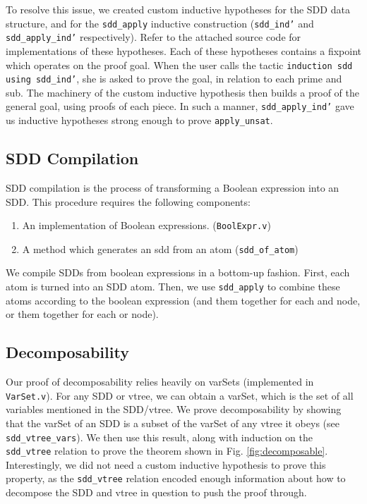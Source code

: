 \documentclass[twocolumn]{article}
\theoremstyle{definition}
\begin{document}
To resolve this issue, we created custom inductive hypotheses for the SDD data structure, and for the \texttt{sdd\_apply} inductive construction (\texttt{sdd\_ind'} and \texttt{sdd\_apply\_ind'} respectively). Refer to the attached source code for implementations of these hypotheses. Each of these hypotheses contains a fixpoint which operates on the proof goal. When the user calls the tactic \texttt{induction sdd using sdd\_ind'}, she is asked to prove the goal, in relation to each prime and sub. The machinery of the custom inductive hypothesis then builds a proof of the general goal, using proofs of each piece. In such a manner, \texttt{sdd\_apply\_ind'} gave us inductive hypotheses strong enough to prove \texttt{apply\_unsat}.

\subsection{SDD Compilation}
SDD compilation is the process of transforming a Boolean expression into an SDD.
This procedure requires the following components:
\begin{enumerate}
\item An implementation of Boolean expressions. (\texttt{BoolExpr.v})
\item A method which generates an sdd from an atom (\texttt{sdd\_of\_atom})
\end{enumerate}

We compile SDDs from boolean expressions in a bottom-up fashion. First, each atom is turned into an SDD atom. Then, we use \texttt{sdd\_apply} to combine these atoms according to the boolean expression (and them together for each and node, or them together for each or node).

\subsection{Decomposability}

Our proof of decomposability relies heavily on varSets (implemented in \texttt{VarSet.v}). For any SDD or vtree, we can obtain a varSet, which is the set of all variables mentioned in the SDD/vtree. We prove decomposability by showing that the varSet of an SDD is a subset of the varSet of any vtree it obeys (see \texttt{sdd\_vtree\_vars}). We then use this result, along with induction on the \texttt{sdd\_vtree} relation to prove the theorem shown in Fig. \ref{fig:decomposable}. Interestingly, we did not need a custom inductive hypothesis to prove this property, as the \texttt{sdd\_vtree} relation encoded enough information about how to decompose the SDD and vtree in question to push the proof through.
\end{document}
